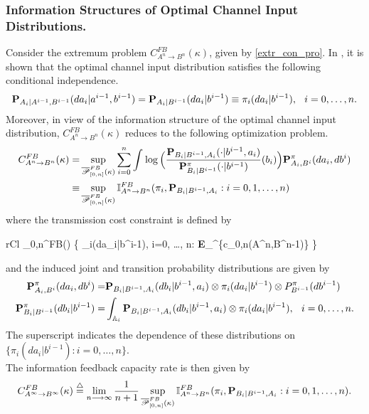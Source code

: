\documentclass[11pt, a4paper, journal,onecolumn]{IEEEtran}
\newcommand{\mb}{\mathbb}
\newcommand{\sr}{\stackrel}
\newcommand{\rar}{\rightarrow}
\newcommand{\tri}{\sr{\triangle}{=}}
\newcommand{\bea}{\begin{eqnarray}}
\newcommand{\eea}{\end{eqnarray}}
\newcommand{\beae}{\begin{IEEEeqnarray}{rCl}}
\newcommand{\eeae}{\end{IEEEeqnarray}}
\newcommand{\hso}{\hspace{.1in}}
\begin{document}
\subsubsection{Information Structures of Optimal Channel Input Distributions.} Consider the extremum problem $C_{A^n \rar B^n}^{FB}(\kappa)$, given by \eqref{extr_con_pro}. In \cite{kourtellaris2015information, kourtellarisISIT2016}, it is shown that the optimal channel input distribution satisfies the following conditional independence.
\bea
{\bf P}_{A_i|A^{i-1},B^{i-1}}({da}_i|a^{i-1},b^{i-1})={\bf P}_{A_i|B^{i-1}}({da}_i|b^{i-1})\equiv \pi_i(da_i|b^{i-1}), \hso  i=0, \ldots, n. \label{CAD}
\eea
Moreover, in view of the information structure of the optimal channel input distribution, $C_{A^n \rar B^n}^{FB}(\kappa)$ reduces to the following optimization problem.
\begin{align}
C_{A^n \rar B^n}^{FB}(\kappa)=& \sup_{ \overline{\cal P}_{[0,n]}^{FB}(\kappa) } \sum_{i=0}^n \int_{  }^{}   \log \Big( \frac{ {\bf P}_{B_i|B^{i-1}, A_i}(\cdot|b^{i-1}, a_i) }{{\bf P}_{B_i|B^{i-1}}^\pi(\cdot|b^{i-1})}(b_i)\Big){ \bf P}_{A_i, B^i}^\pi( da_i, db^i) \label{IS_1} \\
\equiv & \sup_{ \overline{\cal P}_{[0,n]}^{FB}(\kappa)  }  {\mathbb I}_{A^n \rar B^n}^{FB}(\pi_i,  {\bf P}_{B_i|B^{i-1},A_i}: i=0,1, \ldots, n)      \label{func_1}  
\end{align}
where the transmission cost constraint is defined by 
\beae
{}_{0,n}^{FB}(\kappa) {\tri} \Big\{ \pi_i(da_i|b^{i-1}), i=0, \ldots, n:  {} {\bf E}_\mu^\pi \big\{c_{0,n}(A^n,B^{n{-}1})\big\} \leq \kappa\Big\}
\eeae
and the induced joint and transition probability distributions are given by  
\begin{align}
{\bf  P}_{A_i, B^i}^\pi(da_i, db^i)
=&{\bf P}_{B_i|B^{i-1}, A_i}(db_i|b^{i-1}, a_i)\otimes \pi_i(da_i|b^{i-1})\otimes {P}^{\pi}_{B^{i-1}}(d{b}^{i-1}) \label{CIS_2gg_new_n} \\
{\bf  P}_{B_i|B^{i-1}}^\pi(db_i|b^{i-1})=&  \int_{{\mb A}_i} {\bf P}_{B_i|B^{i-1}, A_i}(db_i|b^{i-1}, a_i)\otimes {\pi}_i(da_i|b^{i-1}), \hso  i=0, \ldots, n . \label{CIS_3a_n}
\end{align}
The superscript indicates the dependence of these distributions on $\{\pi_i(da_i|b^{i-1}): i=0, \ldots, n\}$.\\
The information feedback capacity rate  is then given by 
\begin{align}
C_{A^\infty \rar B^\infty}^{FB}(\kappa) \tri \lim_{n \longrightarrow \infty} \frac{1}{n+1} \sup_{ \overline{\cal P}_{[0,n]}^{FB}(\kappa)  }  {\mathbb I}_{A^n \rar B^n}^{FB}(\pi_i,  {\bf P}_{B_i|B^{i-1},A_i}: i=0,1, \ldots, n).  \label{ifc_1}      
\end{align}
\end{document}
